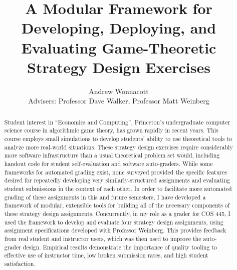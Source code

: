 \documentclass[pageno]{jpaper}
\begin{document}
\title{
  A Modular Framework for Developing, Deploying, and Evaluating Game-Theoretic Strategy Design Exercises
}

\author{
  Andrew Wonnacott\\
  Advisers: Professor Dave Walker, Professor Matt Weinberg
}

\date{}
\maketitle

\doublespacing{}

\begin{titlingpage}
  \begin{abstract}
    Student interest in ``Economics and Computing'', Princeton's undergraduate computer science course in algorithmic game theory, has grown rapidly in recent years.
    This course employs small simulations to develop students' ability to use theoretical tools to analyze more real-world situations.
    These strategy design exercises require considerably more software infrastructure than a usual theoretical problem set would, including handout code for student self-evaluation and software auto-graders.
    While some frameworks for automated grading exist, none surveyed provided the specific features desired for repeatedly developing very similarly-structured assignments and evaluating student submissions in the context of each other.
    In order to facilitate more automated grading of these assignments in this and future semesters, I have developed a framework of modular, extensible tools for building all of the necessary components of these strategy design assignments.
    Concurrently, in my role as a grader for COS 445, I used the framework to develop and evaluate four strategy design assignments, using assignment specifications developed with Professor Weinberg.
    This provides feedback from real student and instructor users, which was then used to improve the auto-grader design.
    Empirical results demonstrate the importance of quality tooling to effective use of instructor time, low broken submission rates, and high student satisfaction.
  \end{abstract}
\end{titlingpage}
\end{document}
